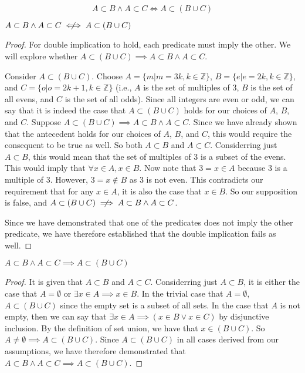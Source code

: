 \documentclass[main.tex]{subfiles}
\begin{document}
\subproblem{}\label{2a}
\[A \subset B \land A \subset C \iff A \subset (B \cup C)\]
\begin{thm}
	\(A \subset B \land A \subset C \centernot\iff A \subset (B \cup C)\)
\end{thm}
\begin{proof}
	For double implication to hold, each predicate must imply the other. We
	will explore whether
	\(A \subset (B \cup C) \implies A \subset B \land A \subset C\).

	Consider \(A \subset (B \cup C)\). Choose
	\(A = \{m | m = 3k, k \in \mathbb{Z}\}\),
	\(B = \{e | e = 2k, k \in \mathbb{Z}\}\),
	and \(C = \{o | o = 2k + 1, k \in \mathbb{Z}\}\) (i.e., \(A\) is the set
	of multiples of	3, \(B\) is the set of all evens, and \(C\) is the set
	of all odds). Since all integers are even or odd, we can say that it is
	indeed the case that \(A \subset (B \cup C)\) holds for our choices of
	\(A\), \(B\), and \(C\). Suppose
	\(A \subset (B \cup C) \implies A \subset B \land A \subset C\). Since
	we have already shown that the antecedent holds for our choices of
	\(A\), \(B\), and \(C\), this would require the consequent to be true as
	well. So both \(A \subset B\) and \(A \subset C\). Considerring just
	\(A \subset B\), this would mean that the set of multiples of 3 is a
	subset of the evens. This would imply that \(\forall x \in A, x \in B\).
	Now note that \(3 = x \in A\) because 3 is a multiple of 3. However,
	\(3 = x \notin B\) as 3 is not even. This contradicts our requirement
	that for any \(x \in A\), it is also the case that \(x \in B\). So our
	supposition is false, and
	\(A \subset (B \cup C) \centernot\implies A \subset B \land A \subset C\).

	Since we have demonstrated that one of the predicates does not imply the
	other predicate, we have therefore established that the double
	implication fails as well.
\end{proof}

\begin{thm}
	\(A \subset B \land A \subset C \implies A \subset (B \cup C)\)
\end{thm}
\begin{proof}
	It is given that \(A \subset B\) and \(A \subset C\). Considerring just
	\(A \subset B\), it is either the case that \(A = \emptyset\) or
	\(\exists x \in A \implies x \in B\). In the trivial case that
	\(A = \emptyset\), \(A \subset (B \cup C)\) since the empty set is a
	subset of all sets. In the case that \(A\) is not empty, then we can say
	that \(\exists x \in A \implies (x \in B \lor x \in C)\) by disjunctive
	inclusion. By the definition of set union, we have that
	\(x \in (B \cup C)\). So
	\(A \neq \emptyset \implies A \subset (B \cup C)\). Since
	\(A \subset (B \cup C)\) in all cases derived from our assumptions, we
	have therefore demonstrated that
	\(A \subset B \land A \subset C \implies A \subset (B \cup C)\).
\end{proof}
\end{document}
